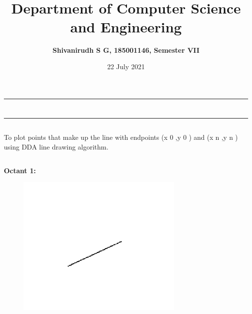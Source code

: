 \documentclass[12pt,letterpaper]{article}
\title{\textbf{Department of Computer Science and Engineering}}
\author{\textbf{Shivanirudh S G, 185001146, Semester VII }}
\date{22 July 2021}
\begin{document}
\maketitle
\hrule
\section*{}
\hrule 
\bigskip\bigskip

\subsection*{}

\subsection*{}
\begin{flushleft}
    To plot points that make up the line with endpoints (x 0 ,y 0 ) and (x n ,y n ) using DDA line drawing algorithm.   
\end{flushleft}

\subsection*{}
\begin{flushleft}




\end{flushleft}
\newpage
\subsection*{}
\textbf{Octant 1:}
\begin{figure}[h]
    \centering
    \includegraphics[height=7cm]{Outputs/O1-1.png}
\end{figure}
\end{document}
